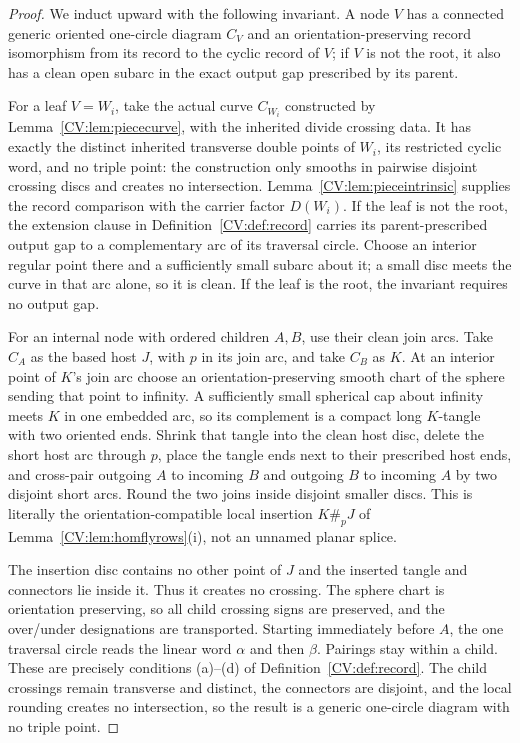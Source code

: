 \begin{proof}
We induct upward with the following invariant. A node $V$ has a connected
generic oriented one-circle diagram $C_V$ and an orientation-preserving record
isomorphism from its record to the cyclic record of $V$; if $V$ is not the
root, it also has a clean open subarc in the exact output gap prescribed by its
parent.

For a leaf $V=W_i$, take the actual curve $C_{W_i}$ constructed by
Lemma~\ref{CV:lem:piececurve}, with the inherited divide crossing data. It has
exactly the distinct inherited transverse double points of $W_i$, its
restricted cyclic word, and no triple point: the construction only smooths in
pairwise disjoint crossing discs and creates no intersection.
Lemma~\ref{CV:lem:pieceintrinsic} supplies the record comparison with the carrier
factor $D(W_i)$. If the leaf is not the root, the extension clause in
Definition~\ref{CV:def:record} carries its parent-prescribed output gap to a
complementary arc of its traversal circle. Choose an interior regular point
there and a sufficiently small subarc about it; a small disc meets the curve
in that arc alone, so it is clean. If the leaf is the root, the invariant
requires no output gap.

For an internal node with ordered children $A,B$, use their clean join arcs.
Take $C_A$ as the based host $J$, with $p$ in its join arc, and take $C_B$ as
$K$. At an interior point of $K$'s join arc choose an
orientation-preserving smooth chart of the sphere sending that point to
infinity. A sufficiently small spherical cap about infinity meets $K$ in one
embedded arc, so its complement is a compact long $K$-tangle with two oriented
ends. Shrink that tangle into the clean host disc, delete the short host arc
through $p$, place the tangle ends next to their prescribed host ends, and
cross-pair outgoing $A$ to incoming $B$ and outgoing $B$ to incoming $A$ by
two disjoint short arcs. Round the two joins inside disjoint smaller discs.
This is literally the orientation-compatible local insertion $K\#_pJ$ of
Lemma~\ref{CV:lem:homflyrows}(i), not an unnamed planar splice.

The insertion disc contains no other point of $J$ and the inserted tangle and
connectors lie inside it. Thus it creates no crossing. The sphere chart is
orientation preserving, so all child crossing signs are preserved, and the
over/under designations are transported. Starting immediately before $A$, the
one traversal circle reads the linear word $\alpha$ and then $\beta$.
Pairings stay within a child. These are precisely conditions (a)--(d) of
Definition~\ref{CV:def:record}. The child crossings remain transverse and
distinct, the connectors are disjoint, and the local rounding creates no
intersection, so the result is a generic one-circle diagram with no triple
point.


\end{proof}
